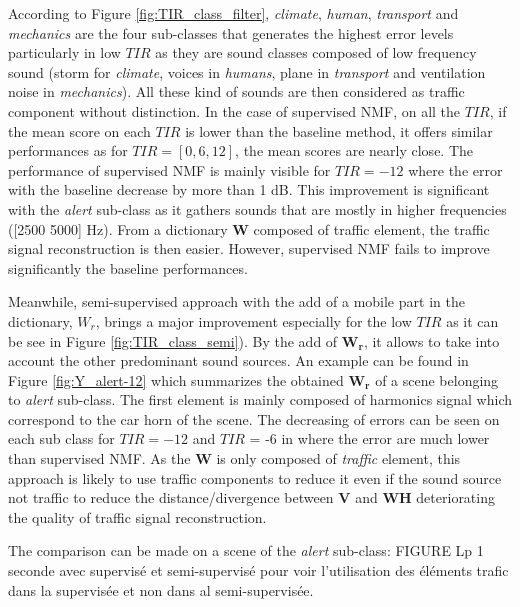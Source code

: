 \documentclass[twocolumn,a4paper,10pt]{article}
\begin{document}
According to Figure \ref{fig:TIR_class_filter}, \textit{climate}, \textit{human}, \textit{transport} and \textit{mechanics} are the four sub-classes that generates the highest error levels particularly in low $TIR$ as they are sound classes composed of low frequency sound (storm for \textit{climate}, voices in \textit{humans}, plane in \textit{transport} and ventilation noise in \textit{mechanics}). All these kind of sounds are then considered as traffic component without distinction.
In the case of supervised NMF, on all the $TIR$, if the mean score on each $TIR$ is lower than the baseline method, it offers similar performances as for $TIR = [0, 6, 12]$, the mean scores are nearly close. The performance of supervised NMF is mainly visible for $TIR = -12$ where the error with the baseline decrease by more than 1 dB. This improvement is significant with the \textit{alert} sub-class as it gathers sounds that are mostly in higher frequencies ([2500 5000] Hz). From a dictionary $\mathbf{W}$ composed of traffic element, the traffic signal reconstruction is then easier. However, supervised NMF fails to improve significantly the baseline performances.

Meanwhile, semi-supervised approach with the add of a mobile part in the dictionary, $W_r$, brings a major improvement especially for the low $TIR$ as it can be see in Figure \ref{fig:TIR_class_semi}). By the add of $\mathbf{W_r}$, it allows to take into account the other predominant sound sources. An example can be found in Figure \ref{fig:Y_alert-12} which summarizes the obtained $\mathbf{W_r}$ of a scene belonging to \textit{alert} sub-class. The first element is mainly composed of harmonics signal which correspond to the car horn of the scene. The decreasing of errors can be seen on each sub class for $TIR = -12$ and $TIR$ = -6 in  where the error are much lower than supervised NMF.
As the $\mathbf{W}$ is only composed of \textit{traffic} element, this approach is likely to use traffic components to reduce it even if the sound source not traffic to reduce the distance/divergence between $\mathbf{V}$ and $\mathbf{WH}$ deteriorating the quality of traffic signal reconstruction.

The comparison can be made on a scene of the \textit{alert} sub-class:
FIGURE Lp 1 seconde avec supervisé et semi-supervisé pour voir l'utilisation des éléments trafic dans la supervisée et non dans al semi-supervisée. \\
\end{document}
